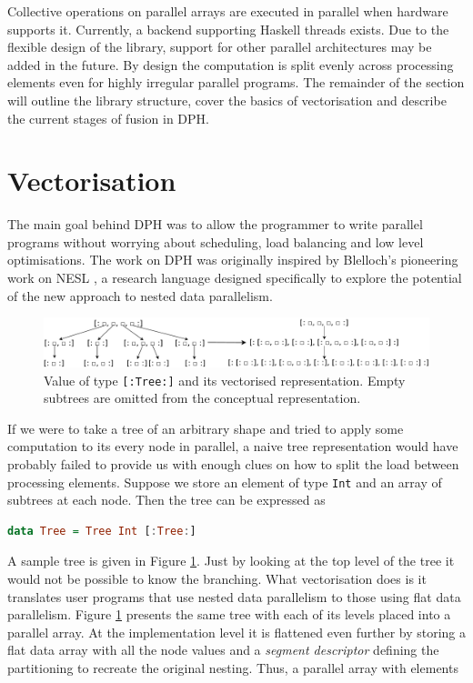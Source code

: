 \documentclass[preamble.tex]{subfiles}
\begin{document}
Collective operations on parallel arrays are executed in parallel when hardware supports it. Currently, a backend supporting Haskell threads \cite{Jones08atutorial} exists. Due to the flexible design of the library, support for other parallel architectures may be added in the future. By design the computation is split evenly across processing elements even for highly irregular parallel programs. The remainder of the section will outline the library structure, cover the basics of vectorisation and describe the current stages of fusion in DPH.


\section{Vectorisation}

The main goal behind DPH was to allow the programmer to write parallel programs without worrying about scheduling, load balancing and low level optimisations. The work on DPH was originally inspired by Blelloch's pioneering work on NESL \cite{BCH+}, a research language designed specifically to explore the potential of the new approach to nested data parallelism.

\begin{figure}
\includegraphics[width=1\textwidth]{img/TreeRepr}

\caption{\label{fig:Lit:Tree}{Value of type \texttt{{[}:Tree:{]}} and its vectorised representation. Empty subtrees are omitted from the conceptual representation.}}
\end{figure}


If we were to take a tree of an arbitrary shape and tried to apply some computation to its every node in parallel, a naive tree representation would have probably failed to provide us with enough clues on how to split the load between processing elements. Suppose we store an element of type \texttt{Int} and an array of subtrees at each node. Then the tree can be expressed as

\begin{lstlisting}[basicstyle={\ttfamily},language=Haskell,tabsize=4]
data Tree = Tree Int [:Tree:]
\end{lstlisting}


A sample tree is given in Figure \ref{fig:Lit:Tree}. Just by looking at the top level of the tree it would not be possible to know the branching. What vectorisation does is it translates user programs that use nested data parallelism to those using flat data parallelism. Figure \ref{fig:Lit:Tree} presents the same tree with each of its levels placed into a parallel array. At the implementation level it is flattened even further by storing a flat data array with all the node values and a \emph{segment descriptor} defining the partitioning to recreate the original nesting. Thus, a parallel array with elements
\end{document}
